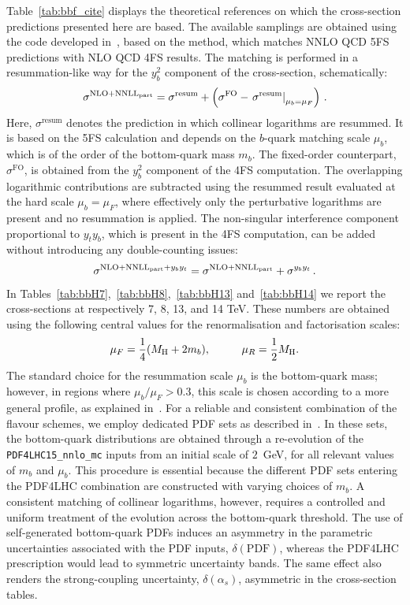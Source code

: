 Table~\ref{tab:bbf_cite} displays the theoretical references on which the cross-section predictions presented here are based. The available samplings are obtained using the code developed in~\cite{Bonvini:2016fgf}, based on the \nlonnllpart{} method, which matches NNLO QCD 5FS predictions with NLO QCD 4FS results. The matching is performed in a resummation-like way for the $y_b^2$ component of the cross-section, schematically:
\begin{align}
	\sigma^{\text{NLO+NNLL\textsubscript{part}}}=\sigma^{\text{resum}}+\left( \sigma^{\text{FO}} - \left.\sigma^{\text{resum}}\right|_{\mu_b=\mu_F} \right)\,.	\label{eq:FSmatching}
\end{align}
Here, $\sigma^{\text{resum}}$ denotes the prediction in which collinear logarithms are resummed. It is based on the 5FS calculation and depends on the $b$-quark matching scale $\mu_b$, which is of the order of the bottom-quark mass $m_b$. The fixed-order counterpart, $\sigma^{\text{FO}}$, is obtained from the $y_b^2$ component of the 4FS computation. The overlapping logarithmic contributions are subtracted using the resummed result evaluated at the hard scale $\mu_b = \mu_F$, where effectively only the perturbative logarithms are present and no resummation is applied. The non-singular interference component proportional to $y_t y_b$, which is present in the 4FS computation, can be added without introducing any double-counting issues:
\begin{align}
	\sigma^{\text{NLO+NNLL\textsubscript{part}+$y_by_t$}} = \sigma^{\text{NLO+NNLL\textsubscript{part}}} + \sigma^{y_b y_t}\,.
\end{align}
In Tables~\ref{tab:bbH7},~\ref{tab:bbH8},~\ref{tab:bbH13} and~\ref{tab:bbH14} we report the \nlonnllpart{} cross-sections at respectively 7, 8, 13, and 14 TeV. These numbers are obtained using the following central values for the renormalisation and factorisation scales:
\begin{align}
\mu_F=\frac{1}{4}(M_\mathrm{H}+2m_b),\hspace{1cm}\mu_R=\frac{1}{2}M_\mathrm{H}.
\end{align}
The standard choice for the resummation scale $\mu_b$ is the bottom-quark mass; however, in regions where $\mu_b/\mu_F > 0.3$, this scale is chosen according to a more general profile, as explained in~. For a reliable and consistent combination of the flavour schemes, we employ dedicated PDF sets as described in~. In these sets, the bottom-quark distributions are obtained through a re-evolution of the \texttt{PDF4LHC15\_nnlo\_mc} inputs from an initial scale of $2$~GeV, for all relevant values of $m_b$ and $\mu_b$. This procedure is essential because the different PDF sets entering the PDF4LHC combination are constructed with varying choices of $m_b$. A consistent matching of collinear logarithms, however, requires a controlled and uniform treatment of the evolution across the bottom-quark threshold. The use of self-generated bottom-quark PDFs induces an asymmetry in the parametric uncertainties associated with the PDF inputs, $\delta(\text{PDF})$, whereas the PDF4LHC prescription would lead to symmetric uncertainty bands. The same effect also renders the strong-coupling uncertainty, $\delta(\alpha_s)$, asymmetric in the cross-section tables.


